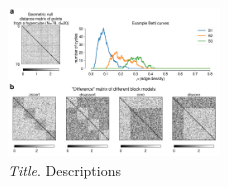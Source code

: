 \begin{figure}[H]
    \centering
    \includegraphics[width=0.5\textwidth,center]{../figures/report/Fig2.png}
    \caption{\label{fig:2}
    \textit{Title}.
    Descriptions
    }
\end{figure}